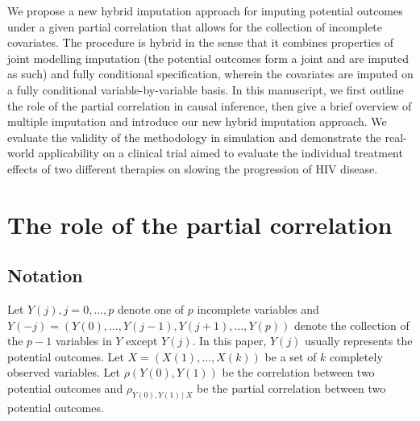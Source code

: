 	We propose a new hybrid imputation approach for imputing potential outcomes under a given partial correlation that allows for the collection of incomplete covariates. The procedure is hybrid in the sense that it combines properties of joint modelling imputation (the potential outcomes form a joint and are imputed as such) and fully conditional specification, wherein the covariates are imputed on a fully conditional variable-by-variable basis. In this manuscript, we first outline the role of the partial correlation in causal inference, then give a brief overview of multiple imputation and introduce our new hybrid imputation approach. We evaluate the validity of the methodology in simulation and demonstrate the real-world applicability on a clinical trial aimed to evaluate the individual treatment effects of two different therapies on slowing the progression of HIV disease.	
	
	
	\section{The role of the partial correlation}
	\label{sec:4.2}
	\subsection{Notation}
		Let ${Y(j), j = 0, \dots, p}$ denote one of $p$ incomplete variables and $Y(-j) = (Y(0), \dots, Y(j-1), Y(j+1), \dots, Y(p))$ denote the collection of the $p-1$ variables in $Y$ except $Y(j)$. In this paper, $Y(j)$ usually represents the potential outcomes. Let $X = (X(1), \dots, X(k))$ be a set of $k$ completely observed variables. Let $\rho(Y(0), Y(1))$ be the correlation between two potential outcomes and $\rho_{Y(0), Y(1)\,|\ X}$ be the partial correlation between two potential outcomes. 
